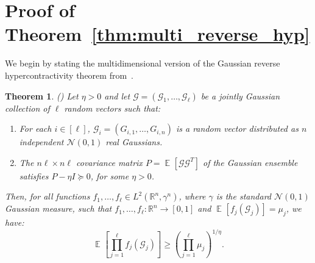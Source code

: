 \documentclass[10pt,a4paper]{amsart}
\newtheorem{thm}{Theorem}[section]
\newcommand\Expect[2]{{\mathop{\mathbb{E}}_{#1}\left[ {#2} \right]}}
\renewcommand\geq{\geqslant}
\begin{document}



\appendix

\section{Proof of Theorem~\ref{thm:multi_reverse_hyp}}
\label{sec:GRH_complex}

We begin by stating the multidimensional version of the Gaussian reverse hypercontractivity theorem from~\cite{ChenDafnisPaouris2015HolderGaussian, Mos}.

\begin{thm}\label{thm:multi_reverse_hyp_real}(\cite{ChenDafnisPaouris2015HolderGaussian, Mos})
	Let $\eta>0$ and let $\mathbf{\mathcal{G}} = (\mathcal{G}_1,\ldots,\mathcal{G}_{\ell})$ be a jointly Gaussian collection of $\ell$ random vectors such that:
	\begin{enumerate}
		\item For each $i \in [\ell]$, $\mathcal{G}_i = \left(G_{i,1}, \ldots, G_{i,n}\right)$ is a random vector distributed as $n$ independent $\mathcal{N}(0,1)$ real Gaussians.
		\item  The $n\ell\times n\ell$ covariance matrix $P = \Expect{}{\mathcal{G}\mathcal{G}^T}$ of the Gaussian ensemble satisfies  $P-\eta I\succeq 0$, for some $\eta>0$. 
	\end{enumerate}
	Then, for all functions $f_1,\ldots,f_{\ell} \in L^2(\mathbb{R}^n,\gamma^n)$, where $\gamma$ is the standard $\mathcal{N}(0,1)$ Gaussian measure, such that $f_{1},\ldots,f_{\ell} : \mathbb{R}^n \to [0,1]$ and
	$\Expect{}{f_{j}(\mathcal{G}_{j})} = \mu_j$,
	we have:
	\[
	\Expect{}{\prod_{j=1}^\ell f_{j}(\mathcal{G}_{j})} \geq
	\left( \prod_{j=1}^\ell \mu_j \right)^{1/\eta}.
	\]
\end{thm}
\end{document}
